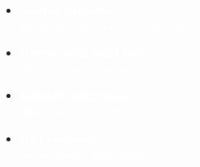 \documentclass[aspectratio=169,10pt]{beamer}
\begin{document}
\begin{frame}[plain]
\begin{columns}[T,onlytextwidth]
\begin{tcolorbox}[colback=darkblue!80, colframe=solanagreen, width=\textwidth, arc=3mm, title=\textcolor{white}{\textbf{DEMO FEATURES}}, boxsep=0.2cm]
\begin{itemize}
            \item \textcolor{solanagreen}{\faEye} \textcolor{white}{\textbf{See the invisible}}\\[-0.1cm]
            \textcolor{white}{\small Watch matching on encrypted data}\\[0.1cm]
            
            \item \textcolor{solanagreen}{\faKey} \textcolor{white}{\textbf{Reveal with valid keys}}\\[-0.1cm]
            \textcolor{white}{\small For demo purposes only}\\[0.1cm]
            
            \item \textcolor{solanagreen}{\faRobot} \textcolor{white}{\textbf{ElizaOS integration}}\\[-0.1cm]
            \textcolor{white}{\small "Hey Eliza, buy 5 SOL"}\\[0.1cm]
            
            \item \textcolor{solanagreen}{\faCode} \textcolor{white}{\textbf{API endpoints}}\\[-0.1cm]
            \textcolor{white}{\small For developer integration}
        \end{itemize}
    \end{tcolorbox}
\end{columns}


\end{frame}
\end{document}
